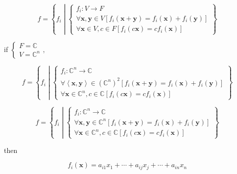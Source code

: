 \documentclass[
]{book}
\theoremstyle{definition}
\theoremstyle{definition}
\theoremstyle{definition}
\theoremstyle{definition}
\theoremstyle{remark}
\begin{document}
\[
f=\left\{ f_{{\scriptscriptstyle i}}\middle|\begin{cases}
f_{{\scriptscriptstyle i}}:V\rightarrow F\\
\forall\boldsymbol{x},\boldsymbol{y}\in V\left[f_{{\scriptscriptstyle i}}\left(\boldsymbol{x}+\boldsymbol{y}\right)=f_{{\scriptscriptstyle i}}\left(\boldsymbol{x}\right)+f_{{\scriptscriptstyle i}}\left(\boldsymbol{y}\right)\right]\\
\forall\boldsymbol{x}\in V,c\in F\left[f_{{\scriptscriptstyle i}}\left(c\boldsymbol{x}\right)=cf_{{\scriptscriptstyle i}}\left(\boldsymbol{x}\right)\right]
\end{cases}\right\} 
\]

if \(\begin{cases}
F=\mathbb{C}\\
V=\mathbb{C}^{n}
\end{cases}\),

\[
f=\left\{ f_{{\scriptscriptstyle i}}\middle|\begin{cases}
f_{{\scriptscriptstyle i}}:\mathbb{C}^{n}\rightarrow\mathbb{C}\\
\forall\left\langle \boldsymbol{x},\boldsymbol{y}\right\rangle \in\left(\mathbb{C}^{n}\right)^{2}\left[f_{{\scriptscriptstyle i}}\left(\boldsymbol{x}+\boldsymbol{y}\right)=f_{{\scriptscriptstyle i}}\left(\boldsymbol{x}\right)+f_{{\scriptscriptstyle i}}\left(\boldsymbol{y}\right)\right]\\
\forall\boldsymbol{x}\in\mathbb{C}^{n},c\in\mathbb{C}\left[f_{{\scriptscriptstyle i}}\left(c\boldsymbol{x}\right)=cf_{{\scriptscriptstyle i}}\left(\boldsymbol{x}\right)\right]
\end{cases}\right\} 
\]

\[
f=\left\{ f_{{\scriptscriptstyle i}}\middle|\begin{cases}
f_{{\scriptscriptstyle i}}:\mathbb{C}^{n}\rightarrow\mathbb{C}\\
\forall\boldsymbol{x},\boldsymbol{y}\in\mathbb{C}^{n}\left[f_{{\scriptscriptstyle i}}\left(\boldsymbol{x}+\boldsymbol{y}\right)=f_{{\scriptscriptstyle i}}\left(\boldsymbol{x}\right)+f_{{\scriptscriptstyle i}}\left(\boldsymbol{y}\right)\right]\\
\forall\boldsymbol{x}\in\mathbb{C}^{n},c\in\mathbb{C}\left[f_{{\scriptscriptstyle i}}\left(c\boldsymbol{x}\right)=cf_{{\scriptscriptstyle i}}\left(\boldsymbol{x}\right)\right]
\end{cases}\right\} 
\]

then

\[
f_{{\scriptscriptstyle i}}\left(\boldsymbol{x}\right)=a_{{\scriptscriptstyle i1}}x_{{\scriptscriptstyle 1}}+\cdots+a_{{\scriptscriptstyle ij}}x_{{\scriptscriptstyle j}}+\cdots+a_{{\scriptscriptstyle in}}x_{{\scriptscriptstyle n}}
\]
\end{document}
